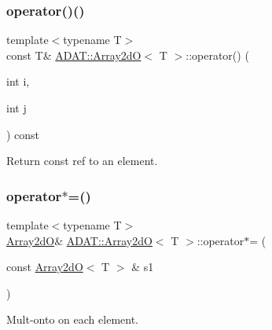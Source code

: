 \subsubsection{\texorpdfstring{operator()()}{operator()()}\hspace{0.1cm}{\footnotesize\ttfamily [4/4]}}
{\footnotesize\ttfamily template$<$typename T$>$ \\
const T\& \mbox{\hyperlink{classADAT_1_1Array2dO}{A\+D\+A\+T\+::\+Array2dO}}$<$ T $>$\+::operator() (\begin{DoxyParamCaption}\item[{int}]{i,  }\item[{int}]{j }\end{DoxyParamCaption}) const\hspace{0.3cm}{\ttfamily [inline]}}



Return const ref to an element. 

\mbox{\label{classADAT_1_1Array2dO_af8304f9edc7ab12b002b6a96f02a2111}} 
\subsubsection{\texorpdfstring{operator$\ast$=()}{operator*=()}\hspace{0.1cm}{\footnotesize\ttfamily [1/4]}}
{\footnotesize\ttfamily template$<$typename T$>$ \\
\mbox{\hyperlink{classADAT_1_1Array2dO}{Array2dO}}\& \mbox{\hyperlink{classADAT_1_1Array2dO}{A\+D\+A\+T\+::\+Array2dO}}$<$ T $>$\+::operator$\ast$= (\begin{DoxyParamCaption}\item[{const \mbox{\hyperlink{classADAT_1_1Array2dO}{Array2dO}}$<$ T $>$ \&}]{s1 }\end{DoxyParamCaption})\hspace{0.3cm}{\ttfamily [inline]}}



Mult-\/onto on each element. 

\mbox{\label{classADAT_1_1Array2dO_af8304f9edc7ab12b002b6a96f02a2111}} 
